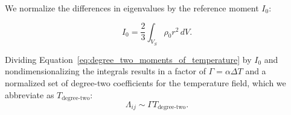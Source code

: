 \documentclass[preprint,12pt,authoryear]{elsarticle}
\newif\ifdetail
\begin{document}
We normalize the differences in eigenvalues by the reference moment $I_0$:
\ifdetail
\begin{equation}
\begin{aligned}
\int_{V_S} \rho_0 \frac{2 r^2 - Y_{20}^*}{3} &= \int_{V_S} \rho_0 (x^2 + y^2) dV = I_0 \\
\end{aligned}
\end{equation}
\begin{equation}
I_0 = \frac{2}{3} \int_{V_S} \rho_0 r^2 \left(1 - 2 \sqrt{\frac{\pi}{5}} Y_{20}\right) \,dV
\end{equation}
\fi
\begin{equation}
I_0 = \frac{2}{3} \int_{V_S} \rho_0 r^2 \,dV.
\end{equation}
\ifdetail
\begin{equation}
\begin{aligned}
\Lambda_{21} &= \alpha \Delta T \frac{-6 \sqrt{\frac{\pi}{15} } \int_{V_S} T^\prime r^2  Y_{22} \,dV}{\int_{V_S} r^2 \, dV} \\
\Lambda_{31} &= \alpha \Delta T \frac{-3 \sqrt{ \frac{\pi}{15} } \int_{V_S} T^\prime r^2 \left( Y_{22} - \sqrt{3} Y_{20} \right) dV}{\int_{V_S} r^2 \, dV}\\
\Lambda_{32} &= \alpha \Delta T \frac{3 \sqrt{ \frac{\pi}{15} }  \int_{V_S}  T^\prime r^2 \left( Y_{22} + \sqrt{3} Y_{20} \right) dV}{\int_{V_S} r^2 \, dV} \\
\end{aligned}
\end{equation}
\begin{equation}
\begin{aligned}
\Lambda_{21} &= \Gamma \frac{-6 \sqrt{\frac{\pi}{15} } \int_{V_S^\prime} T^\prime {r^\prime}^2  Y_{22} \,dV^\prime}{\int_{V_S^\prime} {r^\prime}^2 \,dV^\prime} \\
\Lambda_{31} &= \Gamma \frac{-3 \sqrt{ \frac{\pi}{15} } \int_{V_S^\prime} T^\prime {r^\prime}^2 \left( Y_{22} - \sqrt{3} Y_{20} \right) dV^\prime}{\int_{V_S} {r^\prime}^2 \, dV^\prime}\\
\Lambda_{32} &= \Gamma \frac{3 \sqrt{ \frac{\pi}{15} }  \int_{V_S^\prime}  T^\prime {r^\prime}^2 \left( Y_{22} + \sqrt{3} Y_{20} \right) dV^\prime}{\int_{V_S} {r^\prime}^2 \, dV^\prime} \\
\end{aligned}
\end{equation}
\fi
Dividing Equation~\eqref{eq:degree_two_moments_of_temperature} by $I_0$ and nondimensionalizing 
the integrals results in a factor of $\Gamma = \alpha \Delta T$ and a normalized set of 
degree-two coefficients for the temperature field, which we abbreviate as $T_{\text{degree-two}}$:
\begin{equation}
\Lambda_{ij} \sim \Gamma T_{\text{degree-two}}.
\end{equation}

\end{document}
